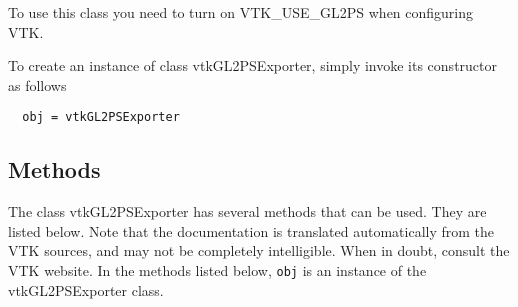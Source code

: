  To use this class you need to turn on VTK\_USE\_GL2PS when
 configuring VTK.

To create an instance of class vtkGL2PSExporter, simply
invoke its constructor as follows
\begin{verbatim}
  obj = vtkGL2PSExporter
\end{verbatim}
\subsection{Methods}

The class vtkGL2PSExporter has several methods that can be used.
  They are listed below.
Note that the documentation is translated automatically from the VTK sources,
and may not be completely intelligible.  When in doubt, consult the VTK website.
In the methods listed below, \verb|obj| is an instance of the vtkGL2PSExporter class.
